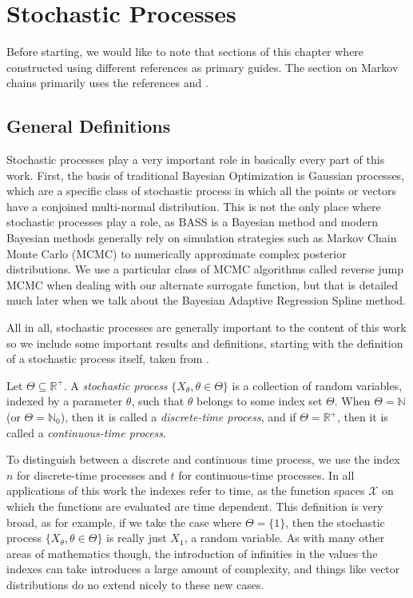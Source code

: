 \chapter{Stochastic Processes}

Before starting, we would like to note that sections of this chapter where constructed using different references as primary guides. The section on Markov chains primarily uses the references \cite{Zitkovic_2010} and \cite{hohendorff_introduction_2005}. 

\section{General Definitions}

Stochastic processes play a very important role in basically every part of this work. First, the basis of traditional Bayesian Optimization is Gaussian processes, which are a specific class of stochastic process in which all the points or vectors have a conjoined multi-normal distribution. This is not the only place where stochastic processes play a role, as BASS is a Bayesian method and modern Bayesian methods generally rely on simulation strategies such as Markov Chain Monte Carlo (MCMC) to numerically approximate complex posterior distributions. We use a particular class of MCMC algorithms called reverse jump MCMC when dealing with our alternate surrogate function, but that is detailed much later when we talk about the Bayesian Adaptive Regression Spline method. 

All in all, stochastic processes are generally important to the content of this work so we include some important results and definitions, starting with the definition of a stochastic process itself, taken from \cite[\S 3.0]{Zitkovic_2010}. 

\begin{definition}
	Let $\Theta \subseteq \mathbb{R}^+$. A \textit{stochastic process} $\{ X_\theta, \theta \in \Theta \}$ is a collection of random variables, indexed by a parameter $\theta$, such that $\theta$ belongs to some index set $\Theta$. When $\Theta = \mathbb{N}$ (or $\Theta = \mathbb{N}_0$), then it is called a \textit{discrete-time process}, and if $\Theta = \mathbb{R}^+$, then it is called a \textit{continuous-time process}. 
\end{definition}

To distinguish between a discrete and continuous time process, we use the index $n$ for discrete-time processes and $t$ for continuous-time processes. 
In all applications of this work the indexes refer to time, as the function spaces $\mathcal{X}$ on which the functions are evaluated are time dependent. 
This definition is very broad, as for example, if we take the case where $\Theta = \{1\}$, then the stochastic process $\{ X_\theta, \theta \in \Theta \}$ is really just $X_1$, a random variable. 
As with many other areas of mathematics though, the introduction of infinities in the values the indexes can take introduces a large amount of complexity, and things like vector distributions do no extend nicely to these new cases. 

